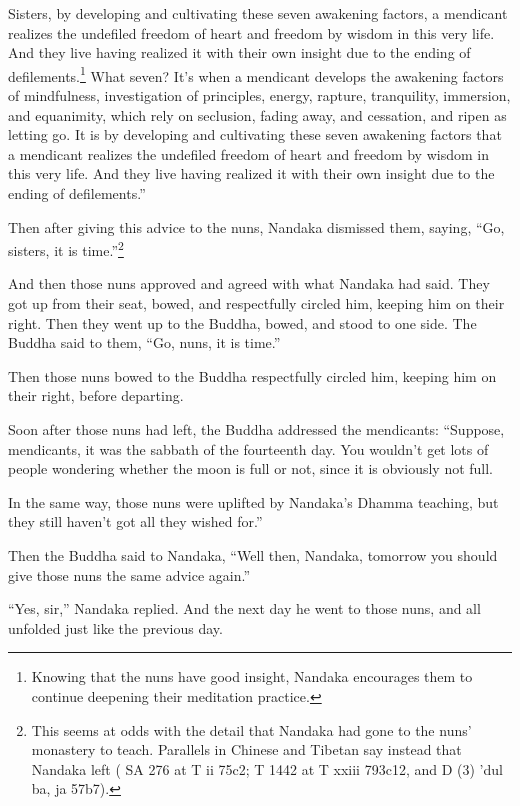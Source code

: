 \documentclass[12pt,openany]{book}%
\begin{document}
Sisters, by developing and cultivating these seven awakening factors, a mendicant realizes the undefiled freedom of heart and freedom by wisdom in this very life. And they live having realized it with their own insight due to the ending of defilements.\footnote{Knowing that the nuns have good insight, Nandaka encourages them to continue deepening their meditation practice. } What seven? It’s when a mendicant develops the awakening factors of mindfulness, investigation of principles, energy, rapture, tranquility, immersion, and equanimity, which rely on seclusion, fading away, and cessation, and ripen as letting go. It is by developing and cultivating these seven awakening factors that a mendicant realizes the undefiled freedom of heart and freedom by wisdom in this very life. And they live having realized it with their own insight due to the ending of defilements.” 

Then after giving this advice to the nuns, Nandaka dismissed them, saying, “Go, sisters, it is time.”\footnote{This seems at odds with the detail that Nandaka had gone to the nuns’ monastery to teach. Parallels in Chinese and Tibetan say instead that Nandaka left ( SA 276 at T ii 75c2; T 1442 at T xxiii 793c12, and D (3) ’dul ba, ja 57b7). } 

And then those nuns approved and agreed with what Nandaka had said. They got up from their seat, bowed, and respectfully circled him, keeping him on their right. Then they went up to the Buddha, bowed, and stood to one side. The Buddha said to them, “Go, nuns, it is time.” 

Then those nuns bowed to the Buddha respectfully circled him, keeping him on their right, before departing. 

Soon after those nuns had left, the Buddha addressed the mendicants: “Suppose, mendicants, it was the sabbath of the fourteenth day. You wouldn’t get lots of people wondering whether the moon is full or not, since it is obviously not full. 

In the same way, those nuns were uplifted by Nandaka’s Dhamma teaching, but they still haven’t got all they wished for.” 

Then the Buddha said to Nandaka, “Well then, Nandaka, tomorrow you should give those nuns the same advice again.” 

“Yes, sir,” Nandaka replied. And the next day he went to those nuns, and all unfolded just like the previous day. 
\end{document}
